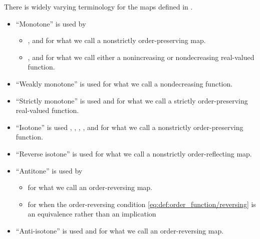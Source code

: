 \begin{remark}\label{rem:order_homomorphism_terminology}
  There is widely varying terminology for the maps defined in .

  \begin{itemize}
    \item \enquote{Monotone} is used by
    \begin{itemize}
      \item {} ,  and  for what we call a nonstrictly order-preserving map.
      \item {},  and  for what we call either a nonincreasing or nondecreasing real-valued function.
    \end{itemize}

    \item \enquote{Weakly monotone} is used  for what we call a nondecreasing function.

    \item \enquote{Strictly monotone} is used  and  for what we call a strictly order-preserving real-valued function.

    \item \enquote{Isotone} is used , , , ,  and  for what we call a nonstrictly order-preserving function.

    \item \enquote{Reverse isotone} is used  for what we call a nonstrictly order-reflecting map.

    \item \enquote{Antitone} is used by
    \begin{itemize}
      \item {} for what we call an order-reversing map.
      \item {} for when the order-reversing condition \eqref{eq:def:order_function/reversing} is an equivalence rather than an implication
    \end{itemize}

    \item \enquote{Anti-isotone} is used  and  for what we call an order-reversing map.


\end{itemize}
\end{remark}
